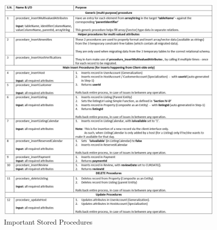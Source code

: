 \documentclass[conference]{IEEEtran}
\begin{document}
   	 \begin{figure}[!h]
        		\centering
		\includegraphics[width=1\textwidth]{../Directly_As_Images/StoredProcedures.JPG}
		\caption{Important Stored Procedures} \label{fig_4}
	\end{figure}

    \vspace{1mm}
    
\end{document}

